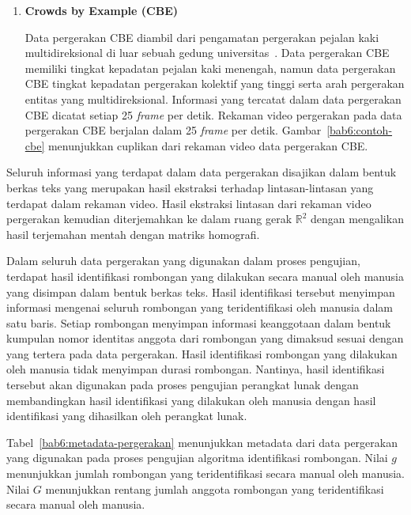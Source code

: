 \begin{enumerate}
    \item \textbf{Crowds by Example (CBE)}
    
    Data pergerakan CBE diambil dari pengamatan pergerakan pejalan kaki multidireksional di luar sebuah gedung universitas~\cite{solera:06:range-reference}. Data pergerakan CBE memiliki tingkat kepadatan pejalan kaki menengah, namun data pergerakan CBE tingkat kepadatan pergerakan kolektif yang tinggi serta arah pergerakan entitas yang multidireksional. Informasi yang tercatat dalam data pergerakan CBE dicatat setiap 25 \textit{frame} per detik. Rekaman video pergerakan pada data pergerakan CBE berjalan dalam 25 \textit{frame} per detik. Gambar~\ref{bab6:contoh-cbe} menunjukkan cuplikan dari rekaman video data pergerakan CBE.
\end{enumerate}

Seluruh informasi yang terdapat dalam data pergerakan disajikan dalam bentuk berkas teks yang merupakan hasil ekstraksi terhadap lintasan-lintasan yang terdapat dalam rekaman video. Hasil ekstraksi lintasan dari rekaman video pergerakan kemudian diterjemahkan ke dalam ruang gerak $\mathbb{R}^2$ dengan mengalikan hasil terjemahan mentah dengan matriks homografi.

Dalam seluruh data pergerakan yang digunakan dalam proses pengujian, terdapat hasil identifikasi rombongan yang dilakukan secara manual oleh manusia yang disimpan dalam bentuk berkas teks. Hasil identifikasi tersebut menyimpan informasi mengenai seluruh rombongan yang teridentifikasi oleh manusia dalam satu baris. Setiap rombongan menyimpan informasi keanggotaan dalam bentuk kumpulan nomor identitas anggota dari rombongan yang dimaksud sesuai dengan yang tertera pada data pergerakan. Hasil identifikasi rombongan yang dilakukan oleh manusia tidak menyimpan durasi rombongan. Nantinya, hasil identifikasi tersebut akan digunakan pada proses pengujian perangkat lunak dengan membandingkan hasil identifikasi yang dilakukan oleh manusia dengan hasil identifikasi yang dihasilkan oleh perangkat lunak.

Tabel~\ref{bab6:metadata-pergerakan} menunjukkan metadata dari data pergerakan yang digunakan pada proses pengujian algoritma identifikasi rombongan. Nilai $g$ menunjukkan jumlah rombongan yang teridentifikasi secara manual oleh manusia. Nilai $G$ menunjukkan rentang jumlah anggota rombongan yang teridentifikasi secara manual oleh manusia.

